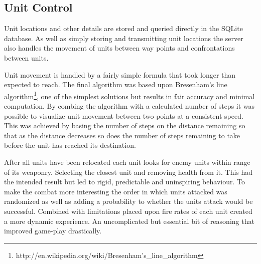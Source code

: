 \subsection{Unit Control}
Unit locations and other details are stored and queried directly in the SQLite database. As well as simply storing and transmitting unit locations the server also handles the movement of units between way points and confrontations between units.

Unit movement is handled by a fairly simple formula that took longer than expected to reach. The final algorithm was based upon Bresenham's line algorithm\footnote{http://en.wikipedia.org/wiki/Bresenham's\_line\_algorithm}, one of the simplest solutions but results in fair accuracy and minimal computation. By combing the algorithm with a calculated number of steps it was possible to visualize unit movement between two points at a consistent speed. This was achieved by basing the number of steps on the distance remaining so that as the distance decreases so does the number of steps remaining to take before the unit has reached its destination.

After all units have been relocated each unit looks for enemy units within range of its weaponry. Selecting the closest unit and removing health from it. This had the intended result but led to rigid, predictable and uninspiring behaviour. To make the combat more interesting the order in which units attacked was randomized as well as adding a probability to whether the units attack would be successful. Combined with limitations placed upon fire rates of each unit created a more dynamic experience. An uncomplicated but essential bit of reasoning that improved game-play drastically.
